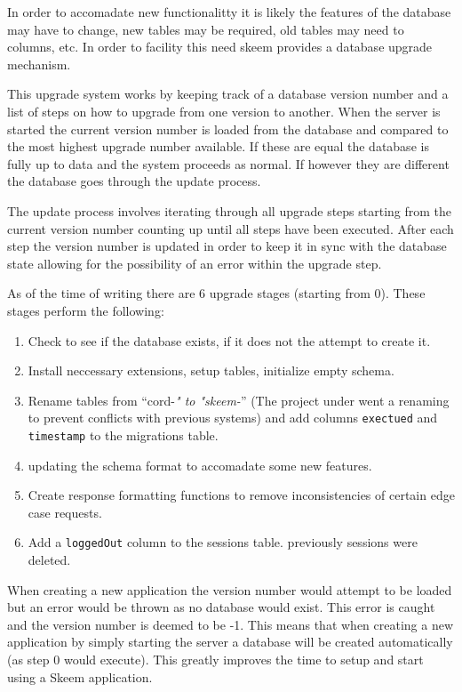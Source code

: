 \documentclass[
  12pt,
]{article}
\newcommand{\passthrough}[1]{#1}
\providecommand{\tightlist}{%
  \setlength{\itemsep}{0pt}\setlength{\parskip}{0pt}}
\begin{document}
In order to accomadate new functionalitty it is likely the features of
the database may have to change, new tables may be required, old tables
may need to columns, etc. In order to facility this need skeem provides
a database upgrade mechanism.

This upgrade system works by keeping track of a database version number
and a list of steps on how to upgrade from one version to another. When
the server is started the current version number is loaded from the
database and compared to the most highest upgrade number available. If
these are equal the database is fully up to data and the system proceeds
as normal. If however they are different the database goes through the
update process.

The update process involves iterating through all upgrade steps starting
from the current version number counting up until all steps have been
executed. After each step the version number is updated in order to keep
it in sync with the database state allowing for the possibility of an
error within the upgrade step.

As of the time of writing there are 6 upgrade stages (starting from 0).
These stages perform the following:

\begin{enumerate}
\def\labelenumi{\arabic{enumi}.}
\setcounter{enumi}{-1}
\tightlist
\item
  Check to see if the database exists, if it does not the attempt to
  create it.
\item
  Install neccessary extensions, setup tables, initialize empty schema.
\item
  Rename tables from ``cord-\emph{" to "skeem-}'' (The project under
  went a renaming to prevent conflicts with previous systems) and add
  columns \passthrough{\lstinline!exectued!} and
  \passthrough{\lstinline!timestamp!} to the migrations table.
\item
  updating the schema format to accomadate some new features.
\item
  Create response formatting functions to remove inconsistencies of
  certain edge case requests.
\item
  Add a \passthrough{\lstinline!loggedOut!} column to the sessions
  table. previously sessions were deleted.
\end{enumerate}

When creating a new application the version number would attempt to be
loaded but an error would be thrown as no database would exist. This
error is caught and the version number is deemed to be -1. This means
that when creating a new application by simply starting the server a
database will be created automatically (as step 0 would execute). This
greatly improves the time to setup and start using a Skeem application.
\end{document}

